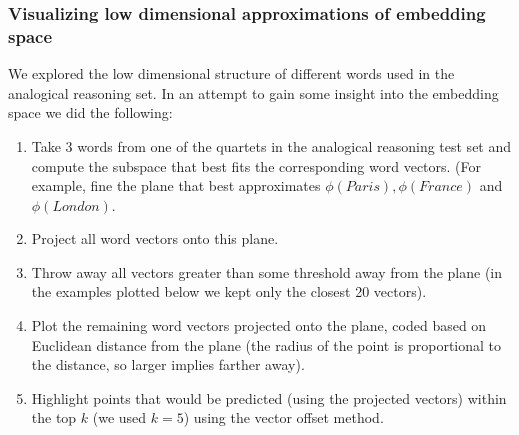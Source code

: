 \subsubsection{Visualizing low dimensional approximations of embedding space}

We explored the low dimensional structure of different words used in the analogical reasoning set. In an attempt to gain some insight into the embedding space we did the following:
\begin{enumerate}
  \item Take 3 words from one of the quartets in the analogical reasoning test set and compute the subspace that best fits the corresponding word vectors. (For example, fine the plane that best approximates $\phi(Paris), \phi(France)$ and $\phi(London)$. 
  \item Project all word vectors onto this plane.
  \item Throw away all vectors greater than some threshold away from the plane (in the examples plotted below we kept only the closest 20 vectors).
  \item Plot the remaining word vectors projected onto the plane, coded based on Euclidean distance from the plane (the radius of the point is proportional to the distance, so larger implies farther away). 
  \item Highlight points that would be predicted (using the projected vectors) within the top $k$ (we used $k = 5$) using the vector offset method.
\end{enumerate}


